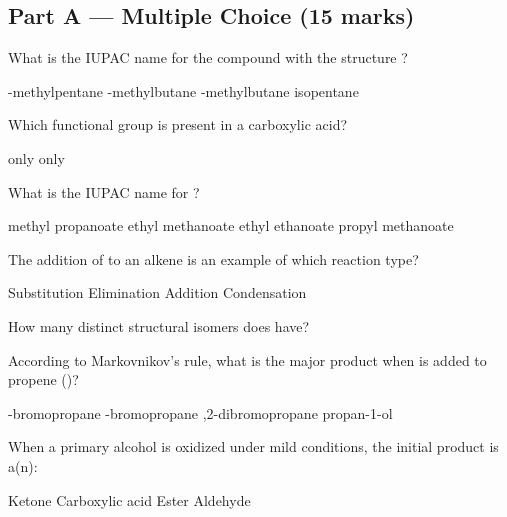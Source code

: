\documentclass[addpoints]{exam}
\begin{document}
\newpage
\begin{questions}

\section*{Part A --- Multiple Choice (15 marks)}
\vspace{5mm}

\question[1] What is the IUPAC name for the compound with the structure
?
\begin{choices}
    -methylpentane
    -methylbutane
    -methylbutane
    \choice isopentane
\end{choices}

\question[1] Which functional group is present in a carboxylic acid?
\begin{choices}
    \choice {} only
    \choice {} only
    \correctchoice {}
    \choice {}
\end{choices}

\question[1] What is the IUPAC name for ?
\begin{choices}
    \choice methyl propanoate
    \choice ethyl methanoate
    \correctchoice ethyl ethanoate
    \choice propyl methanoate
\end{choices}

\question[1] The addition of  to an alkene is an example of which reaction type?
\begin{choices}
    \choice Substitution
    \choice Elimination
    \correctchoice Addition
    \choice Condensation
\end{choices}

\question[1] How many distinct structural isomers does  have?
\begin{choices}
\end{choices}

\question[1] According to Markovnikov's rule, what is the major product when  is added
to propene ()?
\begin{choices}
    -bromopropane
    -bromopropane
    ,2-dibromopropane
    \choice propan-1-ol
\end{choices}

\question[1] When a primary alcohol is oxidized under mild conditions, the initial product is a(n):
\begin{choices}
    \choice Ketone
    \choice Carboxylic acid
    \choice Ester
    \correctchoice Aldehyde
\end{choices}


\end{questions}
\end{document}
